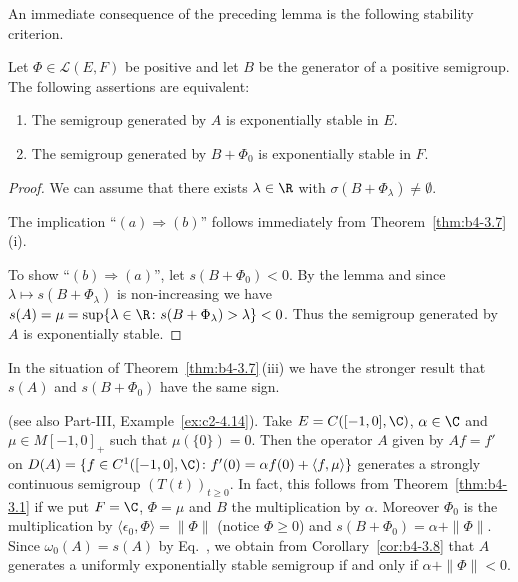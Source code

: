 An immediate consequence of the preceding lemma is the following stability criterion.
\begin{corollary}\label{cor:b4-3.8}
Let $\Phi \in \mathcal{L}(E,F)$ be positive and let $B$ be the generator of a positive semigroup. 
The following assertions are equivalent:
\begin{enumerate}[\upshape (a)]
	\item 
    The semigroup generated by $A$ is exponentially stable in $E$.
	
    \item 
    The semigroup generated by $B + \Phi_{0}$ is exponentially stable in $F$.
\end{enumerate}
\end{corollary}
\begin{proof}
We can assume that there exists $\lambda \in \R$ with $\sigma(B+\Phi_{\lambda}) \neq \emptyset$.

The implication \enquote{$(a)\Rightarrow(b)$} follows immediately from Theorem~\ref{thm:b4-3.7}\,(i).

To show \enquote{$(b)\Rightarrow(a)$}, let $s(B+\Phi_{0}) < 0$. 
By the lemma and since $\lambda \mapsto s(B+\Phi_{\lambda})$ is non-increasing we have $s(A) = \mu = \sup\{\lambda \in \R \colon s(B+\Phi_{\lambda}) > \lambda\} < 0$. 
Thus the semigroup generated by $A$ is exponentially stable.
\end{proof}
\begin{remark*}
In the situation of Theorem~\ref{thm:b4-3.7}\,(iii) we have the stronger result that $s(A)$ and $s(B + \Phi_{0})$ have the same sign.
\end{remark*}
\begin{example}\label{ex:b4-3.9}
(see also Part-III, Example~\ref{ex:c2-4.14}). Take $E = C([-1,0],\C)$, $\alpha \in \C$ and $\mu \in M[-1,0]_{+}$ such that $\mu(\{0\}) = 0$. 
Then the operator $A$ given by $Af = f'$ on $D(A) = \{f \in C^1([-1,0],\C) \colon f'(0) = \alpha f(0) + \langle f,\mu\rangle\}$ generates a strongly continuous semigroup $(T(t))_{t\geq0}$. 
In fact, this follows from Theorem~\ref{thm:b4-3.1} if we put $F = \C$, $\Phi = \mu$ and $B$ the multiplication by $\alpha$. 
Moreover $\Phi_{0}$ is the multiplication by $ \langle \epsilon_{0}, \Phi  \rangle = \|\Phi\|$ (notice 
$\Phi\geq 0$) and $s(B + \Phi_{0}) = \alpha + \|\Phi\|$. 
Since $\omega_{0}(A) = s(A)$ by Eq.~, we obtain from Corollary~\ref{cor:b4-3.8} that $A$ generates a uniformly exponentially stable semigroup if and only if\/ $\alpha + \|\Phi\| < 0$.
\end{example}
